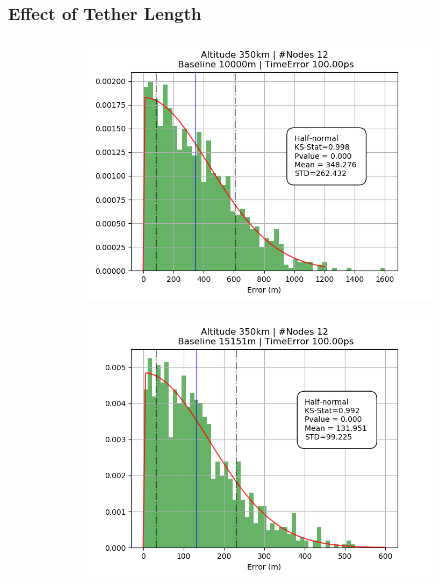 \documentclass{article}
\begin{document}
\subsubsection{Effect of Tether Length}
\begin{figure}[H]
  \centering
  \begin{subfigure}[b]{0.49\linewidth}
    \includegraphics[width=\linewidth]{figures/graphs/350_12_10000_100}
  \end{subfigure}
  \begin{subfigure}[b]{0.49\linewidth}
    \includegraphics[width=\linewidth]{figures/graphs/350_12_15151_100}
  \end{subfigure}
\end{figure}
\end{document}
